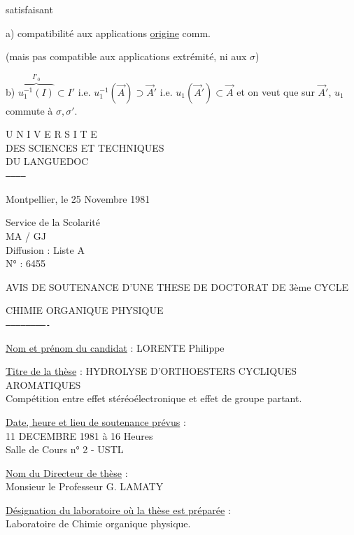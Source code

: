 satisfaisant

a) compatibilité aux applications \uline{origine}
comm.

(mais pas compatible aux applications extrémité, ni aux $\sigma$)

b) $\overbrace{u_1^{-1}(I)}^{I'_0}\subset I'$ i.e. $u_1^{-1}(\vec A)\supset\vec A'$ i.e. $u_1(\vec A')\subset\vec A$
et on veut que sur $\vec A'$, $u_1$ commute à $\sigma,\sigma'$.


U N I V E R S I T E\\
DES SCIENCES ET TECHNIQUES\\
DU LANGUEDOC\\
\texttt{------------}

Montpellier, le 25 Novembre 1981

Service de la Scolarité\\
MA / GJ\\
Diffusion : Liste A\\
N° : 6455

AVIS DE SOUTENANCE D'UNE THESE DE DOCTORAT DE 3ème CYCLE

CHIMIE ORGANIQUE PHYSIQUE\\
\texttt{-------------------------}

\uline{Nom et prénom du candidat} : LORENTE Philippe

\uline{Titre de la thèse} : HYDROLYSE D'ORTHOESTERS CYCLIQUES AROMATIQUES\\
Compétition entre effet stéréoélectronique et effet de groupe partant.

\uline{Date, heure et lieu de soutenance prévus} :\\
11 DECEMBRE 1981 à 16 Heures\\
Salle de Cours n° 2 - USTL

\uline{Nom du Directeur de thèse} :\\
Monsieur le Professeur G. LAMATY

\uline{Désignation du laboratoire où la thèse est préparée} :\\
Laboratoire de Chimie organique physique.

